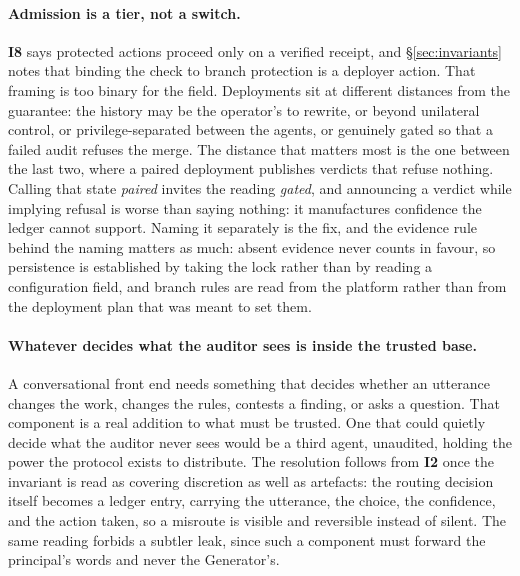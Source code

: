 \documentclass[11pt]{article}
\newcommand{\invariant}[1]{\textbf{I#1}}
\begin{document}
\paragraph{Admission is a tier, not a switch.} \invariant{8} says protected actions proceed only on a verified receipt, and \S\ref{sec:invariants} notes that binding the check to branch protection is a deployer action. That framing is too binary for the field. Deployments sit at different distances from the guarantee: the history may be the operator's to rewrite, or beyond unilateral control, or privilege-separated between the agents, or genuinely gated so that a failed audit refuses the merge. The distance that matters most is the one between the last two, where a paired deployment publishes verdicts that refuse nothing. Calling that state \emph{paired} invites the reading \emph{gated}, and announcing a verdict while implying refusal is worse than saying nothing: it manufactures confidence the ledger cannot support. Naming it separately is the fix, and the evidence rule behind the naming matters as much: absent evidence never counts in favour, so persistence is established by taking the lock rather than by reading a configuration field, and branch rules are read from the platform rather than from the deployment plan that was meant to set them.

\paragraph{Whatever decides what the auditor sees is inside the trusted base.} A conversational front end needs something that decides whether an utterance changes the work, changes the rules, contests a finding, or asks a question. That component is a real addition to what must be trusted. One that could quietly decide what the auditor never sees would be a third agent, unaudited, holding the power the protocol exists to distribute. The resolution follows from \invariant{2} once the invariant is read as covering discretion as well as artefacts: the routing decision itself becomes a ledger entry, carrying the utterance, the choice, the confidence, and the action taken, so a misroute is visible and reversible instead of silent. The same reading forbids a subtler leak, since such a component must forward the principal's words and never the Generator's.
\end{document}
